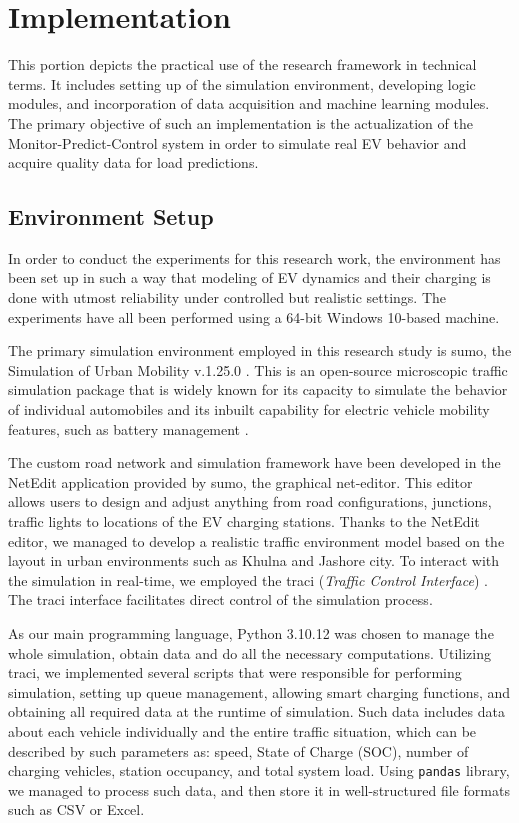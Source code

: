 \documentclass{thesis-library}
\begin{document}
\section{Implementation}

This portion depicts the practical use of the research framework in technical terms. It includes setting up of the simulation environment, developing logic modules, and incorporation of data acquisition and machine learning modules. The primary objective of such an implementation is the actualization of the Monitor-Predict-Control system in order to simulate real EV behavior and acquire quality data for load predictions.

\subsection{Environment Setup}

In order to conduct the experiments for this research work, the environment has been set up in such a way that modeling of EV dynamics and their charging is done with utmost reliability under controlled but realistic settings. The experiments have all been performed using a 64-bit Windows 10-based machine.

The primary simulation environment employed in this research study is \gls{sumo}, the Simulation of Urban Mobility v.1.25.0 \cite{sumo2018}. This is an open-source microscopic traffic simulation package that is widely known for its capacity to simulate the behavior of individual automobiles and its inbuilt capability for electric vehicle mobility features, such as battery management \cite{sumo2018}.

The custom road network and simulation framework have been developed in the NetEdit application provided by \Gls{sumo}, the graphical net-editor. This editor allows users to design and adjust anything from road configurations, junctions, traffic lights to locations of the EV charging stations. Thanks to the NetEdit editor, we managed to develop a realistic traffic environment model based on the layout in urban environments such as Khulna and Jashore city. To interact with the simulation in real-time, we employed the \Gls{traci} (\textit{Traffic Control Interface}) \cite{traci2012}. The \Gls{traci} interface facilitates direct control of the simulation process.

As our main programming language, Python 3.10.12 was chosen to manage the whole simulation, obtain data and do all the necessary computations. Utilizing \Gls{traci}, we implemented several scripts that were responsible for performing simulation, setting up queue management, allowing smart charging functions, and obtaining all required data at the runtime of simulation.
Such data includes data about each vehicle individually and the entire traffic situation, which can be described by such parameters as: speed, State of Charge (SOC), number of charging vehicles, station occupancy, and total system load. Using \texttt{pandas} library, we managed to process such data, and then store it in well-structured file formats such as CSV or Excel.
\end{document}
